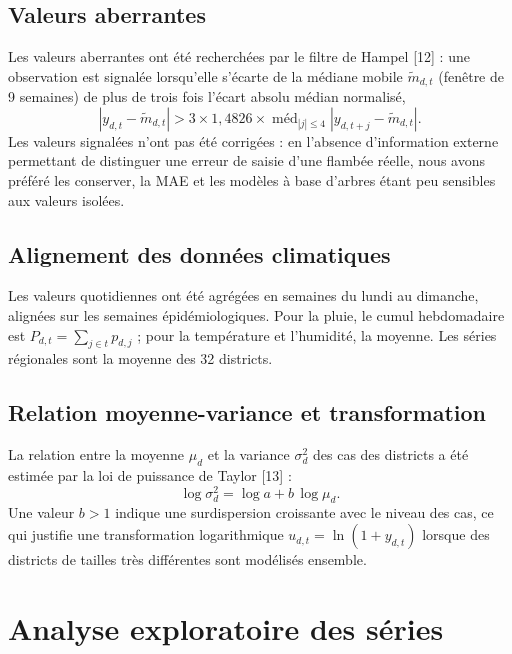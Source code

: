 \documentclass[11pt]{article}
\begin{document}
\subsection{Valeurs aberrantes}
Les valeurs aberrantes ont été recherchées par le filtre de Hampel [12] : une observation est signalée lorsqu'elle s'écarte de la médiane mobile $\tilde{m}_{d,t}$ (fenêtre de 9 semaines) de plus de trois fois l'écart absolu médian normalisé,
\begin{equation}
\left|y_{d,t}-\tilde{m}_{d,t}\right|>3\times1{,}4826\times\operatorname{méd}_{|j|\le4}\left|y_{d,t+j}-\tilde{m}_{d,t}\right|.
\label{eq:hampel}
\end{equation}
Les valeurs signalées n'ont pas été corrigées : en l'absence d'information externe permettant de distinguer une erreur de saisie d'une flambée réelle, nous avons préféré les conserver, la MAE et les modèles à base d'arbres étant peu sensibles aux valeurs isolées.

\subsection{Alignement des données climatiques}
Les valeurs quotidiennes ont été agrégées en semaines du lundi au dimanche, alignées sur les semaines épidémiologiques. Pour la pluie, le cumul hebdomadaire est $P_{d,t}=\sum_{j\in t}p_{d,j}$ ; pour la température et l'humidité, la moyenne. Les séries régionales sont la moyenne des 32 districts.

\subsection{Relation moyenne-variance et transformation}
La relation entre la moyenne $\mu_d$ et la variance $\sigma^2_d$ des cas des districts a été estimée par la loi de puissance de Taylor [13] :
\begin{equation}
\log\sigma^2_d=\log a+b\,\log\mu_d .
\label{eq:taylor}
\end{equation}
Une valeur $b>1$ indique une surdispersion croissante avec le niveau des cas, ce qui justifie une transformation logarithmique $u_{d,t}=\ln(1+y_{d,t})$ lorsque des districts de tailles très différentes sont modélisés ensemble.

\section{Analyse exploratoire des séries}
\end{document}
